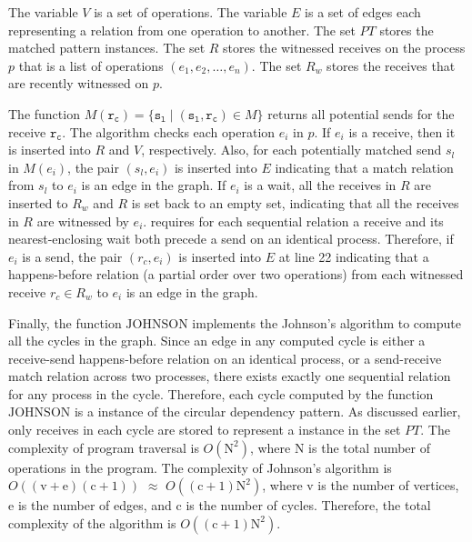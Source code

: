 The variable $\mathit{V}$ is a set of operations. The variable $\mathit{E}$ is a set of edges each representing a relation from one operation to another. 
The set $\mathit{PT}$ stores the matched pattern instances.
The set $\mathit{R}$ stores the witnessed receives on the process $p$ that is a list of operations $(e_1, e_2, \dots, e_n)$. 
The set $\mathit{R_w}$ stores the receives that are recently witnessed on $p$.

The function $\mathit{M}(\mathtt{r_c}) = \{\mathtt{s_l}\mid(\mathtt{s_l},\mathtt{r_c})\in\mathit{M}\}$ returns all potential sends for the receive $\mathtt{r_c}$. The algorithm checks each operation $e_i$ in $p$. 
If $\mathit{e_i}$ is a receive, then it is inserted into $\mathit{R}$ and $\mathit{V}$, respectively. Also, for each potentially matched send $\mathit{s_l}$ in $\mathit{M}(\mathit{e_i})$, the pair $(\mathit{s_l},\mathit{e_i})$ is inserted into $\mathit{E}$ indicating that a match relation from $\mathit{s_l}$ to $\mathit{e_i}$ is an edge in the graph. If $\mathit{e_i}$ is a wait, all the receives in $\mathit{R}$ are inserted to $\mathit{R_w}$ and $\mathit{R}$ is set back to an empty set, indicating that all the receives in $\mathit{R}$ are witnessed by $\mathit{e_i}$.  requires for each sequential relation a receive and its nearest-enclosing wait both precede a send on an identical process. Therefore, %
if $\mathit{e_i}$ is a send, the pair $(\mathit{r_c},\mathit{e_i})$ is inserted into $\mathit{E}$ at line 22 indicating that a happens-before relation (a partial order over two operations) from each witnessed receive $\mathit{r_c}\in\mathit{R_w}$ to $\mathit{e_i}$ is an edge in the graph. 

Finally, the function $\mathrm{JOHNSON}$ implements the Johnson's algorithm to compute all the cycles in the graph. Since an edge in any computed cycle is either a receive-send happens-before relation on an identical process, or a send-receive match relation across two processes, there exists exactly one sequential relation for any process in the cycle. Therefore, each cycle computed by the function $\mathrm{JOHNSON}$ is a instance of the circular dependency pattern. As discussed earlier, only receives in each cycle are stored to represent a instance in the set $\mathit{PT}$. The complexity of program traversal is $O(\mathrm{N}^2)$, where $\mathrm{N}$ is the total number of operations in the program. The complexity of Johnson's algorithm is $O((\mathrm{v}+\mathrm{e})(\mathrm{c}+1))$ $\approx$ $O((\mathrm{c}+1)\mathrm{N}^2)$, where $\mathrm{v}$ is the number of vertices, $\mathrm{e}$ is the number of edges, and $\mathrm{c}$ is the number of cycles. Therefore, the total complexity of the algorithm is $O((\mathrm{c}+1)\mathrm{N}^2)$.

